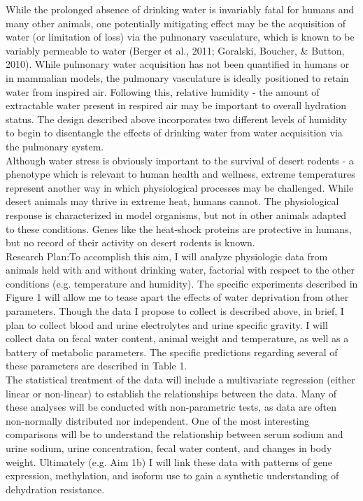 \documentclass[11pt]{article}
\begin{document}
While the prolonged absence of drinking water is invariably fatal for humans and many other animals, one potentially mitigating effect may be the acquisition of water (or limitation of loss) via the pulmonary vasculature, which is known to be variably permeable to water (Berger et al., 2011; Goralski, Boucher, & Button, 2010). While pulmonary water acquisition has not been quantified in humans or in mammalian models, the pulmonary vasculature is ideally positioned to retain water from inspired air. Following this, relative humidity -  the amount of extractable water present in respired air may be important to overall hydration status. The design described above incorporates two different levels of humidity to begin to disentangle the effects of drinking water from water acquisition via the pulmonary system. \\
  

Although water stress is obviously important to the survival of desert rodents - a phenotype which is relevant to human health and wellness, extreme temperatures represent another way in which physiological processes may be challenged. While desert animals may thrive in extreme heat, humans cannot. The physiological response is characterized in model organisms, but not in other animals adapted to these conditions. Genes like the heat-shock proteins are protective in humans, but no record of their activity on desert rodents is known. \\

Research Plan:To accomplish this aim, I will analyze physiologic data from animals held with and without drinking water, factorial with respect to the other conditions (e.g. temperature and humidity). The specific experiments described in \hypertarget{Figure 1}{Figure 1} will allow me to tease apart the effects of water deprivation from other parameters. Though the data I propose to collect is described above, in brief, I plan to collect blood and urine electrolytes and urine specific gravity. I will collect data on fecal water content, animal weight and temperature, as well as a battery of metabolic parameters. The specific predictions regarding several of these parameters are described in Table 1.  \\

The statistical treatment of the data will include a multivariate regression (either linear or non-linear) to establish the relationships between the data. Many of these analyses will be conducted with non-parametric tests, as data are often non-normally distributed nor independent. One of the most interesting comparisons will be to understand the relationship between serum sodium and urine sodium, urine concentration, fecal water content, and changes in body weight. Ultimately (e.g. Aim 1b) I will link these data with patterns of gene expression, methylation, and isoform use to gain a synthetic understanding of dehydration resistance. \\
\end{document}
